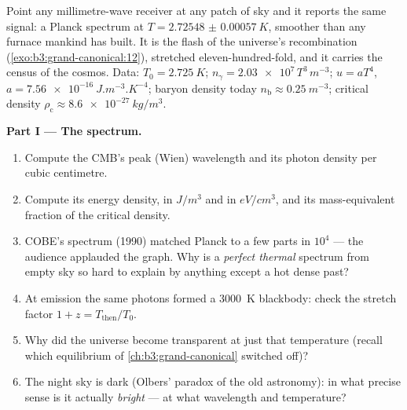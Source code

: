 \begin{problem}\label{pb:b3:photons-phonons:1}
Point any millimetre-wave receiver at any patch of sky and it
reports the same signal: a Planck spectrum at $T =
\qty{2.72548(57)}{K}$, smoother than any furnace mankind has
built. It is the flash of the universe's recombination
(\cref{exo:b3:grand-canonical:12}), stretched eleven-hundred-fold,
and it carries the census of the cosmos. Data: $T_0 =
\qty{2.725}{K}$; $n_\gamma = \num{2.03e7}\,T^3\,\unit{m^{-3}}$;
$u = aT^4$, $a = \qty{7.56e-16}{J.m^{-3}.K^{-4}}$; baryon density
today $n_{\text{b}} \approx \qty{0.25}{m^{-3}}$; critical density
$\rho_{\text{c}} \approx \qty{8.6e-27}{kg/m^3}$.

\medskip\noindent\textbf{Part I --- The spectrum.}
\begin{enumerate}
  \item Compute the CMB's peak (Wien) wavelength and its photon
        density per cubic centimetre.
  \item Compute its energy density, in $\unit{J/m^3}$ and in
        $\unit{eV/cm^3}$, and its mass-equivalent fraction of the
        critical density.
  \item COBE's spectrum (1990) matched Planck to a few parts in
        $10^4$ --- the audience applauded the graph. Why is a
        \emph{perfect thermal} spectrum from empty sky so hard to
        explain by anything except a hot dense past?
  \item At emission the same photons formed a \qty{3000}{K}
        blackbody: check the stretch factor $1 + z =
        T_{\text{then}}/T_0$.
  \item Why did the universe become transparent at just that
        temperature (recall which equilibrium of
        \cref{ch:b3:grand-canonical} switched off)?
  \item The night sky is dark (Olbers' paradox of the old
        astronomy): in what precise sense is it actually
        \emph{bright} --- at what wavelength and temperature?
\end{enumerate}


\end{problem}
